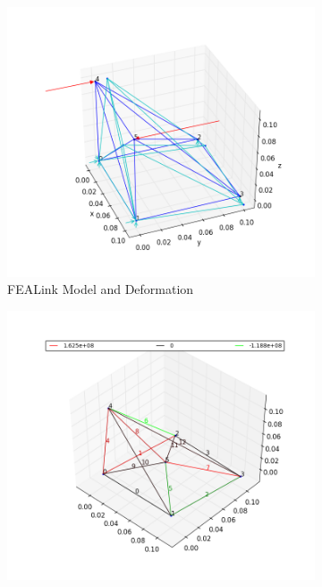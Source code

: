 \documentclass[11pt, oneside]{article}   	%
\begin{document}
\begin{figure}[H]
\centering
  \begin{subfigure}[b]{0.45\textwidth}
    \includegraphics[width=\textwidth]{Verification/FEALink/3dVerification2.png}
    \caption{FEALink Model and Deformation}
    \label{fig:3dV2FEALink1}
  \end{subfigure}
  \begin{subfigure}[b]{.45\textwidth}
    \includegraphics[width=\textwidth]{Verification/FEALink/3dVerification2_image2.png}

\end{subfigure}
\end{figure}
\end{document}
